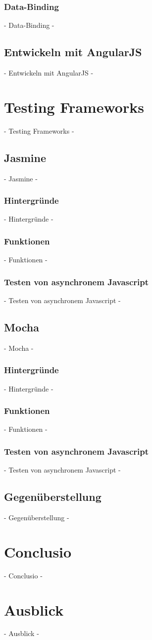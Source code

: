 \subsubsection{Data-Binding}
 - Data-Binding -

\subsection{Entwickeln mit AngularJS}
 - Entwickeln mit AngularJS -

\newpage
\section{Testing Frameworks}
 - Testing Frameworks -

\subsection{Jasmine}
 - Jasmine -

\subsubsection{Hintergründe}
 - Hintergründe -
\subsubsection{Funktionen}
 - Funktionen -
\subsubsection{Testen von asynchronem Javascript}
 - Testen von asynchronem Javascript -

\subsection{Mocha}
 - Mocha -

\subsubsection{Hintergründe}
 - Hintergründe -
\subsubsection{Funktionen}
 - Funktionen -
\subsubsection{Testen von asynchronem Javascript}
 - Testen von asynchronem Javascript -

\subsection{Gegenüberstellung}
 - Gegenüberstellung -
\newpage
\section{Conclusio}
 - Conclusio -

\newpage
\section{Ausblick}
 - Ausblick -

\nocite{Green:2013}
\nocite{Kozlowski:2013}
\nocite{Hahn:2013}
\nocite{Zakas:2012}
\nocite{MacCaw:2011}
\nocite{Burnham:2011}
\nocite{Gaertner:2012}
